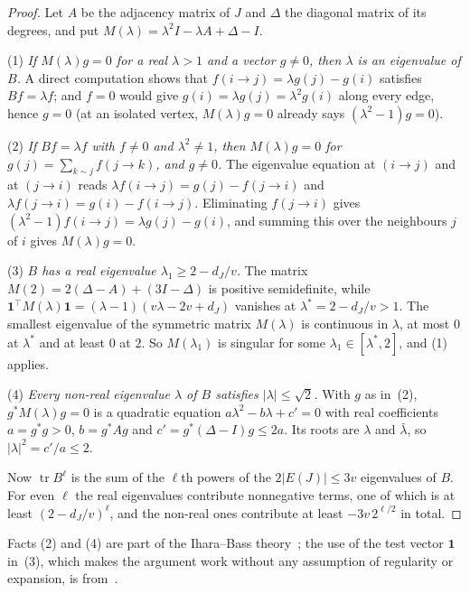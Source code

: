 \documentclass[11pt]{article}
\theoremstyle{definition}
\theoremstyle{remark}
\newcommand{\tr}{\operatorname{tr}}
\begin{document}
\begin{proof}
Let $A$ be the adjacency matrix of $J$ and $\Delta$ the diagonal matrix of its degrees, and put
$M(\lambda)=\lambda^{2}I-\lambda A+\Delta-I$.

(1) \emph{If $M(\lambda)g=0$ for a real $\lambda>1$ and a vector $g\ne0$, then $\lambda$ is an
eigenvalue of $B$.} A direct computation shows that $f(i\to j)=\lambda g(j)-g(i)$ satisfies
$Bf=\lambda f$; and $f=0$ would give $g(i)=\lambda g(j)=\lambda^{2}g(i)$ along every edge, hence
$g=0$ (at an isolated vertex, $M(\lambda)g=0$ already says $(\lambda^{2}-1)g=0$).

(2) \emph{If $Bf=\lambda f$ with $f\ne0$ and $\lambda^{2}\ne1$, then $M(\lambda)g=0$ for
$g(j)=\sum_{k\sim j}f(j\to k)$, and $g\ne0$.} The eigenvalue equation at $(i\to j)$ and at
$(j\to i)$ reads $\lambda f(i\to j)=g(j)-f(j\to i)$ and $\lambda f(j\to i)=g(i)-f(i\to j)$.
Eliminating $f(j\to i)$ gives $(\lambda^{2}-1)f(i\to j)=\lambda g(j)-g(i)$, and summing this over
the neighbours $j$ of $i$ gives $M(\lambda)g=0$.

(3) \emph{$B$ has a real eigenvalue $\lambda_1\ge2-d_J/v$.} The matrix
$M(2)=2(\Delta-A)+(3I-\Delta)$ is positive semidefinite, while
$\mathbf{1}^{\!\top}M(\lambda)\mathbf{1}=(\lambda-1)(v\lambda-2v+d_J)$ vanishes at
$\lambda^{*}=2-d_J/v>1$. The smallest eigenvalue of the symmetric matrix $M(\lambda)$ is continuous
in $\lambda$, at most $0$ at $\lambda^{*}$ and at least $0$ at $2$. So $M(\lambda_1)$ is singular for
some $\lambda_1\in[\lambda^{*},2]$, and (1) applies.

(4) \emph{Every non-real eigenvalue $\lambda$ of $B$ satisfies $|\lambda|\le\sqrt2$.} With $g$ as
in~(2), $g^{*}M(\lambda)g=0$ is a quadratic equation $a\lambda^{2}-b\lambda+c'=0$ with real
coefficients $a=g^{*}g>0$, $b=g^{*}Ag$ and $c'=g^{*}(\Delta-I)g\le2a$. Its roots are $\lambda$ and
$\bar\lambda$, so $|\lambda|^{2}=c'/a\le2$.

Now $\tr B^{\ell}$ is the sum of the $\ell$th powers of the $2|E(J)|\le3v$ eigenvalues of $B$. For
even $\ell$ the real eigenvalues contribute nonnegative terms, one of which is at least
$(2-d_J/v)^{\ell}$, and the non-real ones contribute at least $-3v\,2^{\ell/2}$ in total.
\end{proof}

Facts (2) and (4) are part of the Ihara--Bass theory~\cite{Bass,KS}; the use of the test vector
$\mathbf{1}$ in~(3), which makes the argument work without any assumption of regularity or
expansion, is from~\cite{KNT}.
\end{document}
